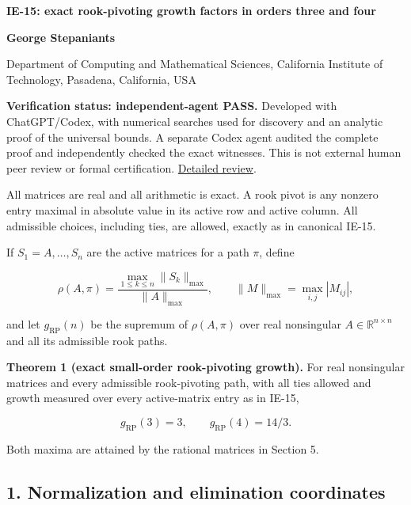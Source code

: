 \documentclass[10pt,a4paper]{article}
\begin{document}
{\raggedright\Large\bfseries IE-15: exact rook-pivoting growth factors
in orders three and four\par}
\vspace{0.4em}
{\normalsize\bfseries George Stepaniants\par}
{\small Department of Computing and Mathematical Sciences, California
Institute of Technology, Pasadena, California, USA\par}
\vspace{0.6em}
\pagestyle{plain}

\textbf{Verification status: independent-agent PASS.} Developed with
ChatGPT/Codex, with numerical searches used for discovery and an
analytic proof of the universal bounds. A separate Codex agent audited
the complete proof and independently checked the exact witnesses. This
is not external human peer review or formal certification.
\href{https://github.com/ajt60gaibb/OpenProblemsInNLA/blob/main/references/stepaniants-ie15-2026-09-11/verification/reviews/IE-15-review.md}{Detailed
review}.

All matrices are real and all arithmetic is exact. A rook pivot is any
nonzero entry maximal in absolute value in its active row and active
column. All admissible choices, including ties, are allowed, exactly as
in canonical IE-15.

If \(S_1=A,\ldots,S_n\) are the active matrices for a path \(\pi\),
define

\[
\rho(A,\pi)=\frac{\max_{1\le k\le n}\|S_k\|_{\max}}{\|A\|_{\max}},
\qquad \|M\|_{\max}=\max_{i,j}|M_{ij}|,
\]

and let \(g_{\mathrm{RP}}(n)\) be the supremum of \(\rho(A,\pi)\) over
real nonsingular \(A\in\mathbb R^{n\times n}\) and all its admissible
rook paths.

\textbf{Theorem 1 (exact small-order rook-pivoting growth).} For real
nonsingular matrices and every admissible rook-pivoting path, with all
ties allowed and growth measured over every active-matrix entry as in
IE-15,

\[
\boxed{g_{\mathrm{RP}}(3)=3,\qquad g_{\mathrm{RP}}(4)=14/3.}
\]

Both maxima are attained by the rational matrices in Section 5.

\subsection{1. Normalization and elimination
coordinates}\label{normalization-and-elimination-coordinates}
\end{document}
